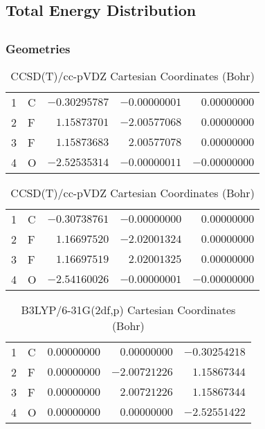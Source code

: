 \documentclass[10pt,oneside]{article}
\begin{document}
\begin{table}
\subsection*{Total Energy Distribution}
\centering\end{table}

\clearpage

\subsection{}

\begin{table}[h!]
\subsubsection*{Geometries}
\begin{multicols}{2}
\centering
\caption{CCSD(T)/cc-pVTZ Cartesian Coordinates (Bohr)}
\begin{tabular}{llrrr}
\toprule
1  & C  & $-0.30295787$ & $-0.00000001$ & $ 0.00000000$ \\
2  & F  & $ 1.15873701$ & $-2.00577068$ & $ 0.00000000$ \\
3  & F  & $ 1.15873683$ & $ 2.00577078$ & $ 0.00000000$ \\
4  & O  & $-2.52535314$ & $-0.00000011$ & $-0.00000000$ \\
\bottomrule
\end{tabular}
\caption{CCSD(T)/cc-pVDZ Cartesian Coordinates (Bohr)}
\begin{tabular}{llrrr}
\toprule
1  & C  & $-0.30738761$ & $-0.00000000$ & $ 0.00000000$ \\
2  & F  & $ 1.16697520$ & $-2.02001324$ & $ 0.00000000$ \\
3  & F  & $ 1.16697519$ & $ 2.02001325$ & $ 0.00000000$ \\
4  & O  & $-2.54160026$ & $-0.00000001$ & $-0.00000000$ \\
\bottomrule
\end{tabular}
\end{multicols}
\end{table}

\begin{table}[h]
\centering
\caption{B3LYP/6-31G(2df,p) Cartesian Coordinates (Bohr)}
\begin{tabular}{llrrr}
\toprule
1  & C  & $ 0.00000000$ & $ 0.00000000$ & $-0.30254218$ \\
2  & F  & $ 0.00000000$ & $-2.00721226$ & $ 1.15867344$ \\
3  & F  & $ 0.00000000$ & $ 2.00721226$ & $ 1.15867344$ \\
4  & O  & $ 0.00000000$ & $ 0.00000000$ & $-2.52551422$ \\
\bottomrule
\end{tabular}
\end{table}
\end{document}
